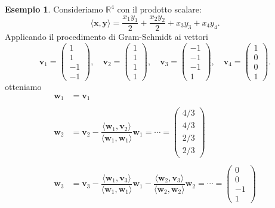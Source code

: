 \documentclass{article}
\theoremstyle{plain}
\theoremstyle{definition}
\newtheorem{exmp}{Esempio}[section]
\theoremstyle{remark}
\begin{document}
\vspace{10pt}

\begin{exmp}
Consideriamo $\mathbb{R}^4$ con il prodotto scalare:
\[
\langle \mathbf{x}, \mathbf{y} \rangle = \dfrac{x_1 y_1}{2}  + \dfrac{x_2 y_2}{2}  + x_3 y_3 + x_4 y_4.
\]
Applicando il procedimento di Gram-Schmidt ai vettori
\[
\mathbf{v}_1 = \begin{pmatrix}1\\1\\-1\\-1\end{pmatrix}, \quad \mathbf{v}_2 = \begin{pmatrix}1\\1\\1\\1\end{pmatrix}, \quad 
\mathbf{v}_3 = \begin{pmatrix}-1\\-1\\-1\\1\end{pmatrix}, \quad \mathbf{v}_4 = \begin{pmatrix}1\\0\\0\\1\end{pmatrix}.
\]
otteniamo
\begin{align*}
    \mathbf{w}_1&=\mathbf{v}_1\\\\
    \mathbf{w}_2&=\mathbf{v}_2-\dfrac{\langle\mathbf{w}_1,\mathbf{v}_2\rangle}{\langle\mathbf{w}_1,\mathbf{w}_1\rangle}\mathbf{w}_1=\cdots=\begin{pmatrix}4/3\\4/3\\2/3\\2/3\end{pmatrix}\\\\
    \mathbf{w}_3&=\mathbf{v}_3-\dfrac{\langle\mathbf{w}_1,\mathbf{v}_3\rangle}{\langle\mathbf{w}_1,\mathbf{w}_1\rangle}\mathbf{w}_1-\dfrac{\langle\mathbf{w}_2,\mathbf{v}_3\rangle}{\langle\mathbf{w}_2,\mathbf{w}_2\rangle}\mathbf{w}_2=\cdots=\begin{pmatrix}0\\0\\-1\\1\end{pmatrix}\\\\

\end{align*}
\end{exmp}
\end{document}
